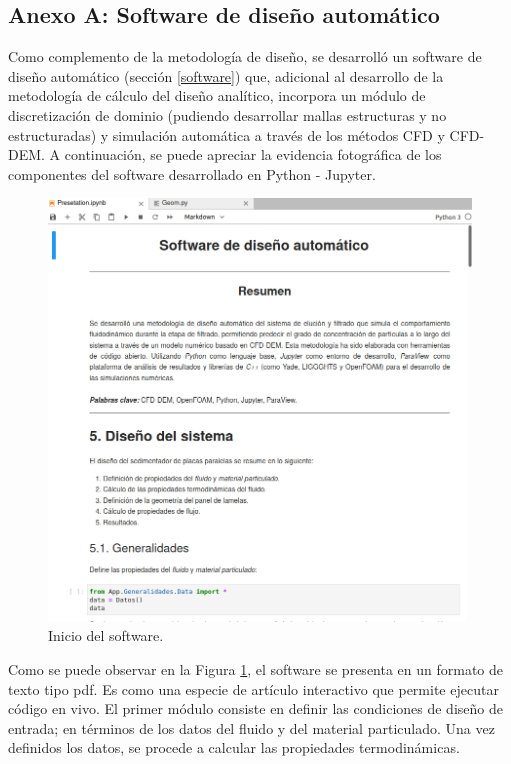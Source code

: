 \begin{center}
	\section*{Anexo A: Software de dise\~no autom\'atico}
\end{center}

\noindent
\justify

Como complemento de la metodolog\'ia de dise\~no, se desarroll\'o un software de dise\~no autom\'atico (secci\'on \ref{software}) que, adicional al desarrollo de la metodolog\'ia de c\'alculo del dise\~no anal\'itico, incorpora un m\'odulo de discretizaci\'on de dominio (pudiendo desarrollar mallas estructuras y no estructuradas) y simulaci\'on autom\'atica a trav\'es de los m\'etodos CFD y CFD-DEM. A continuaci\'on, se puede apreciar la evidencia fotogr\'afica de los componentes del software desarrollado en Python - Jupyter.

\begin{figure}[h!]
	\centering
	\includegraphics[width=\textwidth]{Images/Anexos/1.png}
	\caption{Inicio del software.}
	\label{inicioSoft}
\end{figure}

\noindent
\justify

Como se puede observar en la Figura \ref{inicioSoft}, el software se presenta en un formato de texto tipo pdf. Es como una especie de art\'iculo interactivo que permite ejecutar c\'odigo en vivo. El primer m\'odulo consiste en definir las condiciones de dise\~no de entrada; en t\'erminos de los datos del fluido y del material particulado. Una vez definidos los datos, se procede a calcular las propiedades termodin\'amicas.

